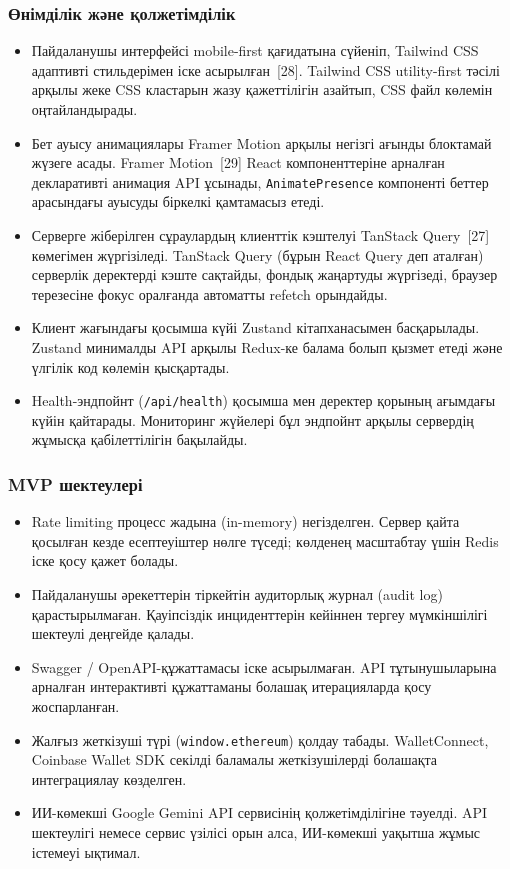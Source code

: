 \documentclass[14pt,a4paper]{extarticle}
\begin{document}
\subsubsection{Өнімділік және қолжетімділік}
\begin{itemize}[nosep]
\item Пайдаланушы интерфейсі mobile-first қағидатына сүйеніп, Tailwind CSS адаптивті стильдерімен іске асырылған~[28]. Tailwind CSS utility-first тәсілі арқылы жеке CSS кластарын жазу қажеттілігін азайтып, CSS файл көлемін оңтайландырады.
\item Бет ауысу анимациялары Framer Motion арқылы негізгі ағынды блоктамай жүзеге асады. Framer Motion~[29] React компоненттеріне арналған декларативті анимация API ұсынады, \texttt{AnimatePresence} компоненті беттер арасындағы ауысуды біркелкі қамтамасыз етеді.
\item Серверге жіберілген сұраулардың клиенттік кэштелуі TanStack Query~[27] көмегімен жүргізіледі. TanStack Query (бұрын React Query деп аталған) серверлік деректерді кэште сақтайды, фондық жаңартуды жүргізеді, браузер терезесіне фокус оралғанда автоматты refetch орындайды.
\item Клиент жағындағы қосымша күйі Zustand кітапханасымен басқарылады. Zustand минималды API арқылы Redux-ке балама болып қызмет етеді және үлгілік код көлемін қысқартады.
\item Health-эндпойнт (\texttt{/api/health}) қосымша мен деректер қорының ағымдағы күйін қайтарады. Мониторинг жүйелері бұл эндпойнт арқылы сервердің жұмысқа қабілеттілігін бақылайды.
\end{itemize}

\subsubsection{MVP шектеулері}
\begin{itemize}[nosep]
\item Rate limiting процесс жадына (in-memory) негізделген. Сервер қайта қосылған кезде есептеуіштер нөлге түседі; көлденең масштабтау үшін Redis іске қосу қажет болады.
\item Пайдаланушы әрекеттерін тіркейтін аудиторлық журнал (audit log) қарастырылмаған. Қауіпсіздік инциденттерін кейіннен тергеу мүмкіншілігі шектеулі деңгейде қалады.
\item Swagger / OpenAPI-құжаттамасы іске асырылмаған. API тұтынушыларына арналған интерактивті құжаттаманы болашақ итерацияларда қосу жоспарланған.
\item Жалғыз жеткізуші түрі (\texttt{window.ethereum}) қолдау табады. WalletConnect, Coinbase Wallet SDK секілді баламалы жеткізушілерді болашақта интеграциялау көзделген.
\item ИИ-көмекші Google Gemini API сервисінің қолжетімділігіне тәуелді. API шектеулігі немесе сервис үзілісі орын алса, ИИ-көмекші уақытша жұмыс істемеуі ықтимал.
\end{itemize}
\end{document}
